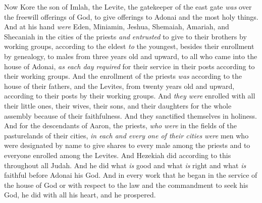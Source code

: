 \begin{biblechapter}
\verse Now Kore the son of Imlah, the Levite, the gatekeeper of the east gate \textit{was} over the freewill offerings of God, to give offerings to Adonai and the most holy things.
\verse And at his hand \textit{were} Eden, Miniamin, Jeshua, Shemaiah, Amariah, and Shecaniah in the cities of the priests \textit{and} \textit{entrusted} to give to their brothers by working groups, according to the eldest \textit{to} the youngest,
\verse besides their enrollment by genealogy, to males from three years old and upward, to all who came into the house of Adonai, \textit{as each day required} for their service in their posts according to their working groups.
\verse And the enrollment of the priests \textit{was} according to the house of their fathers, and the Levites, from twenty years old and upward, according to their posts by their working groups.
\verse And \textit{they were} enrolled with all their little ones, their wives, their sons, and their daughters for the whole assembly because of their faithfulness. And they sanctified themselves in holiness.
\verse And for the descendants of Aaron, the priests, \textit{who were} in the fields of the pasturelands of their cities, \textit{in each and every one of their cities} \textit{were} men who were designated by name to give shares to every male among the priests and to everyone enrolled among the Levites.
\verse And Hezekiah did according to this throughout all Judah. And he did what \textit{is} good and what \textit{is} right and what \textit{is} faithful before Adonai his God.
\verse And in every work that he began in the service of the house of God or with respect to the law and the commandment to seek his God, he did with all his heart, and he prospered.
\end{biblechapter}

